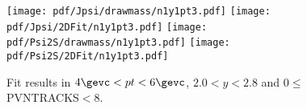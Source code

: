 \begin{figure}[H]
\begin{center}
\texttt{[image: pdf/Jpsi/drawmass/n1y1pt3.pdf]}
\texttt{[image: pdf/Jpsi/2DFit/n1y1pt3.pdf]}
\vspace*{-0.5cm}
\texttt{[image: pdf/Psi2S/drawmass/n1y1pt3.pdf]}
\texttt{[image: pdf/Psi2S/2DFit/n1y1pt3.pdf]}
\vspace*{-0.5cm}
\end{center}
\caption{Fit results in $4\gevc<pt<6\gevc$, $2.0<y<2.8$ and 0$\leq$PVNTRACKS$<$8.}
\label{Fitn1y1pt3}
\end{figure}
